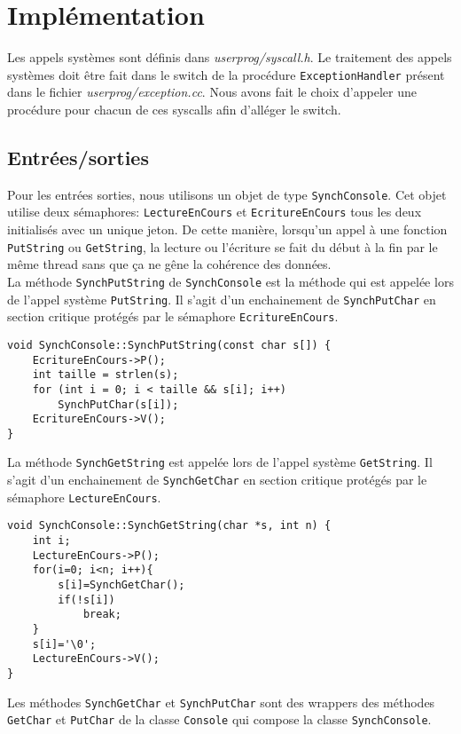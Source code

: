\documentclass{report}
\begin{document}
\section*{Implémentation}
Les appels systèmes sont définis dans \textit{userprog/syscall.h}. Le traitement des appels systèmes doit être fait dans le switch de la procédure \texttt{ExceptionHandler} présent dans le fichier \textit{userprog/exception.cc}. Nous avons fait le choix d'appeler une procédure pour chacun de ces syscalls afin d'alléger le switch.

\subsection*{Entrées/sorties}
Pour les entrées sorties, nous utilisons un objet de type \texttt{SynchConsole}. Cet objet utilise deux sémaphores: \texttt{LectureEnCours} et \texttt{EcritureEnCours} tous les deux initialisés avec un unique jeton. De cette manière, lorsqu'un appel à une fonction \texttt{PutString} ou \texttt{GetString}, la lecture ou l'écriture se fait du début à la fin par le même thread sans que ça ne gêne la cohérence des données.\\

La méthode \texttt{SynchPutString} de \texttt{SynchConsole} est la méthode qui est appelée lors de l'appel système \texttt{PutString}. Il s'agit d'un enchainement de \texttt{SynchPutChar} en section critique protégés par le sémaphore \texttt{EcritureEnCours}.
\begin{verbatim}
void SynchConsole::SynchPutString(const char s[]) {
    EcritureEnCours->P();
    int taille = strlen(s);
    for (int i = 0; i < taille && s[i]; i++)
        SynchPutChar(s[i]);
    EcritureEnCours->V();
}
\end{verbatim}

La méthode \texttt{SynchGetString} est appelée lors de l'appel système \texttt{GetString}. Il s'agit d'un enchainement de \texttt{SynchGetChar} en section critique protégés par le sémaphore \texttt{LectureEnCours}.
\begin{verbatim}
void SynchConsole::SynchGetString(char *s, int n) {
    int i;
    LectureEnCours->P();
    for(i=0; i<n; i++){
        s[i]=SynchGetChar();
        if(!s[i])
            break;
    }
    s[i]='\0';
    LectureEnCours->V();
}
\end{verbatim}

Les méthodes \texttt{SynchGetChar} et \texttt{SynchPutChar} sont des wrappers des méthodes \texttt{GetChar} et \texttt{PutChar} de la classe \texttt{Console} qui compose la classe \texttt{SynchConsole}.\\
\end{document}
